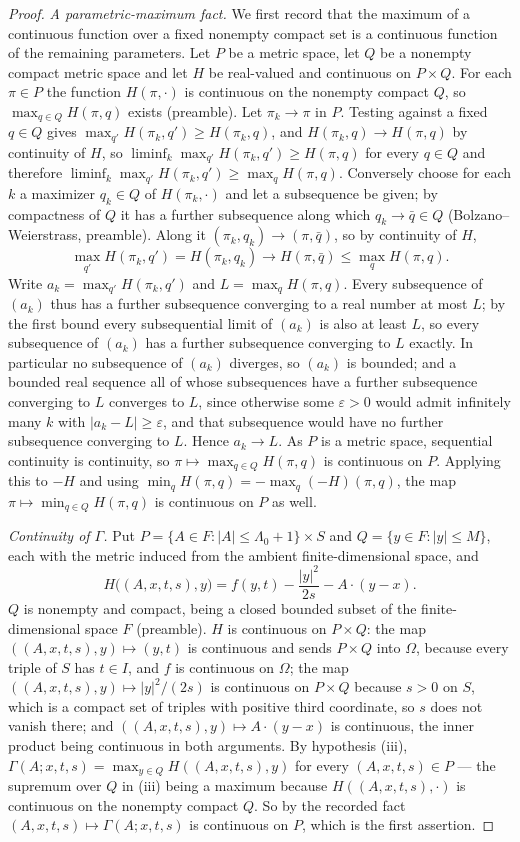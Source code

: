 \begin{proof}
\emph{A parametric-maximum fact.}
We first record that the maximum of a continuous function over a fixed nonempty
compact set is a continuous function of the remaining parameters. Let $P$ be a
metric space, let $Q$ be a nonempty compact metric space and let $H$ be
real-valued and continuous on $P\times Q$. For each $\pi\in P$ the function
$H(\pi,\cdot)$ is continuous on the nonempty compact $Q$, so
$\max_{q\in Q}H(\pi,q)$ exists (preamble). Let $\pi_k\to\pi$ in $P$. Testing
against a fixed $q\in Q$ gives $\max_{q'}H(\pi_k,q')\ge H(\pi_k,q)$, and
$H(\pi_k,q)\to H(\pi,q)$ by continuity of $H$, so
$\liminf_k\max_{q'}H(\pi_k,q')\ge H(\pi,q)$ for every $q\in Q$ and therefore
$\liminf_k\max_{q'}H(\pi_k,q')\ge\max_qH(\pi,q)$. Conversely choose for each $k$
a maximizer $q_k\in Q$ of $H(\pi_k,\cdot)$ and let a subsequence be given; by
compactness of $Q$ it has a further subsequence along which $q_k\to\bar q\in Q$
(Bolzano--Weierstrass, preamble). Along it $(\pi_k,q_k)\to(\pi,\bar q)$, so by
continuity of $H$,
\[
  \max_{q'}H(\pi_k,q')=H(\pi_k,q_k)\longrightarrow H(\pi,\bar q)
   \le\max_qH(\pi,q).
\]
Write $a_k=\max_{q'}H(\pi_k,q')$ and $L=\max_qH(\pi,q)$. Every subsequence of
$(a_k)$ thus has a further subsequence converging to a real number at most $L$;
by the first bound every subsequential limit of $(a_k)$ is also at least $L$, so
every subsequence of $(a_k)$ has a further subsequence converging to $L$ exactly.
In particular no subsequence of $(a_k)$ diverges, so $(a_k)$ is bounded; and a
bounded real sequence all of whose subsequences have a further subsequence
converging to $L$ converges to $L$, since otherwise some $\varepsilon>0$ would
admit infinitely many $k$ with $|a_k-L|\ge\varepsilon$, and that subsequence
would have no further subsequence converging to $L$. Hence $a_k\to L$. As $P$ is
a metric space, sequential continuity is continuity, so
$\pi\mapsto\max_{q\in Q}H(\pi,q)$ is continuous on $P$. Applying this to $-H$ and
using $\min_qH(\pi,q)=-\max_q(-H)(\pi,q)$, the map
$\pi\mapsto\min_{q\in Q}H(\pi,q)$ is continuous on $P$ as well.

\emph{Continuity of $\Gamma$.}
Put $P=\{A\in F:|A|\le\Lambda_0+1\}\times S$ and $Q=\{y\in F:|y|\le M\}$, each
with the metric induced from the ambient finite-dimensional space, and
\[
  H\bigl((A,x,t,s),y\bigr)=f(y,t)-\frac{|y|^2}{2s}-A\cdot(y-x).
\]
$Q$ is nonempty and compact, being a closed bounded subset of the
finite-dimensional space $F$ (preamble). $H$ is continuous on $P\times Q$:
the map $((A,x,t,s),y)\mapsto(y,t)$ is continuous and sends $P\times Q$ into
$\Omega$, because every triple of $S$ has $t\in I$, and $f$ is continuous on
$\Omega$; the map $((A,x,t,s),y)\mapsto|y|^2/(2s)$ is continuous on $P\times Q$
because $s>0$ on $S$, which is a compact set of triples with positive third
coordinate, so $s$ does not vanish there; and
$((A,x,t,s),y)\mapsto A\cdot(y-x)$ is continuous, the inner product being
continuous in both arguments. By hypothesis (iii),
$\Gamma(A;x,t,s)=\max_{y\in Q}H((A,x,t,s),y)$ for every $(A,x,t,s)\in P$ — the
supremum over $Q$ in (iii) being a maximum because $H((A,x,t,s),\cdot)$ is
continuous on the nonempty compact $Q$. So by the recorded fact
$(A,x,t,s)\mapsto\Gamma(A;x,t,s)$ is continuous on $P$, which is the first
assertion.


\end{proof}
